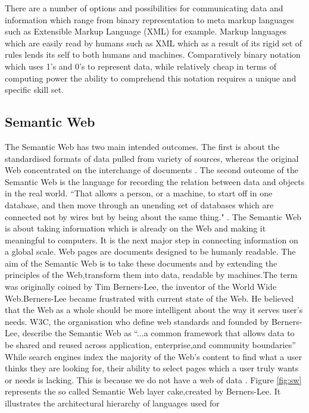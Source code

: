 There are a number of options and possibilities for communicating data and information which range from binary representation to meta markup languages such as Extensible Markup Language (XML) for example. Markup languages which are easily read by humans such as XML which as a result of its rigid set of rules lends its self to both humans and machines. Comparatively binary notation which uses 1's and 0's to represent data, while relatively cheap in terms of computing power the ability to comprehend this notation requires a unique and specific skill set.

\subsection{Semantic Web}\label{semanticweb}
The Semantic Web has two main intended outcomes. The first is about the standardised formats of data pulled from variety of sources, whereas the original Web concentrated on the interchange of documents \cite{semantic}. The second outcome of the Semantic Web is the language for recording the relation between data and objects in the real world. ``That allows a person, or a machine, to start off in one database, and then move through an unending set of databases which are connected not by wires but by being about the same thing."  \cite{semantic}.  The Semantic Web is about taking information which is already on the Web and making it meaningful to computers. It is the next major step in connecting information on a global scale. Web pages are documents designed to be humanly readable. The aim of the Semantic Web is to take these documents and by extending the principles of the Web,transform them into data, readable by machines.The term was originally coined by Tim Berners-Lee, the inventor of the World Wide Web.Berners-Lee became frustrated with current state of the Web. He believed that the Web as a whole should be more intelligent about the way it serves user's needs. W3C, the organisation who define web standards and founded by Berners-Lee, describe the Semantic Web as ``...a common framework that allows data to be shared and reused across application, enterprise,and community boundaries'' \cite{13} While search engines index the majority of the Web's content to find what a user thinks they are looking for, their ability to select pages which a user truly wants or needs is lacking. This is because we do not have a web of data \cite{12}. Figure \ref{fig:sw} represents the so called Semantic Web layer cake,created by Berners-Lee. It illustrates the architectural hierarchy of languages used for 